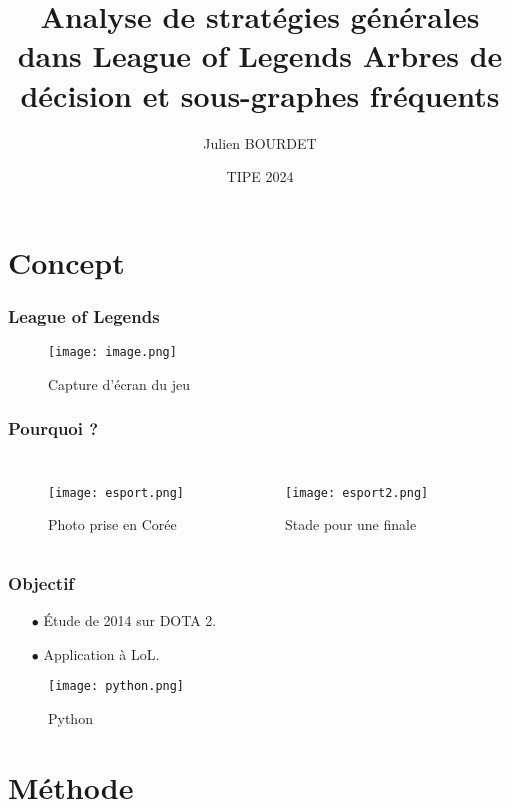 \documentclass{beamer}
\title[Stratégies dans LoL] %
{Analyse de stratégies générales dans League of Legends Arbres de décision et sous-graphes fréquents}
\author{Julien BOURDET}
\institute{37797}
\date[] %
{TIPE 2024}
\begin{document}
\frame{\titlepage}

\section{Concept}

\begin{frame}
    \frametitle{League of Legends\cite{league}}
    \begin{figure}[h]
        \centering
        \texttt{[image: image.png]}
        \caption{Capture d'écran du jeu}
    \end{figure}
\end{frame}

\begin{frame}
    \frametitle{Pourquoi ?}
    \begin{columns}
        \begin{figure}
            \centering
            \texttt{[image: esport.png]}
            \caption{Photo prise en Corée}
        \end{figure}
        \begin{figure}
            \centering
            \texttt{[image: esport2.png]}
            \caption{Stade pour une finale}
        \end{figure}
    \end{columns}
\end{frame}

\begin{frame}
    \frametitle{Objectif}
    \begin{enumerate}
        \item[$\bullet$] Étude de 2014 sur DOTA 2\cite{yang}. \newline \newline
        \item[$\bullet$] Application à LoL.
    \end{enumerate}
    \begin{figure}
        \centering
        \texttt{[image: python.png]}
        \caption{Python}
    \end{figure}
\end{frame}

\section{Méthode}
\end{document}
